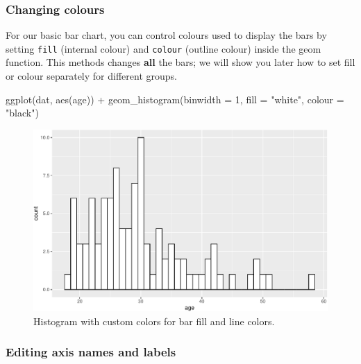 \documentclass[
  english,
  doc,floatsintext]{apa6}
\newenvironment{Shaded}{\begin{snugshade}}{\end{snugshade}}
\newcommand{\AttributeTok}[1]{\textcolor[rgb]{0.77,0.63,0.00}{#1}}
\newcommand{\DecValTok}[1]{\textcolor[rgb]{0.00,0.00,0.81}{#1}}
\newcommand{\FunctionTok}[1]{\textcolor[rgb]{0.00,0.00,0.00}{#1}}
\newcommand{\NormalTok}[1]{#1}
\newcommand{\SpecialCharTok}[1]{\textcolor[rgb]{0.00,0.00,0.00}{#1}}
\newcommand{\StringTok}[1]{\textcolor[rgb]{0.31,0.60,0.02}{#1}}
\begin{document}
\hypertarget{changing-colours}{%
\subsubsection{Changing colours}\label{changing-colours}}

For our basic bar chart, you can control colours used to display the bars by setting \texttt{fill} (internal colour) and \texttt{colour} (outline colour) inside the geom function. This methods changes \textbf{all} the bars; we will show you later how to set fill or colour separately for different groups.

\begin{Shaded}
\begin{Highlighting}[]
\FunctionTok{ggplot}\NormalTok{(dat, }\FunctionTok{aes}\NormalTok{(age)) }\SpecialCharTok{+}
  \FunctionTok{geom\_histogram}\NormalTok{(}\AttributeTok{binwidth =} \DecValTok{1}\NormalTok{, }
                 \AttributeTok{fill =} \StringTok{"white"}\NormalTok{, }
                 \AttributeTok{colour =} \StringTok{"black"}\NormalTok{)}
\end{Highlighting}
\end{Shaded}

\begin{figure}

{\centering \includegraphics[width=1\linewidth]{images/histogram-fill-color-1} 

}

\caption{Histogram with custom colors for bar fill and line colors.}\label{fig:histogram-fill-color}
\end{figure}

\hypertarget{editing-axis-names-and-labels}{%
\subsubsection{Editing axis names and labels}\label{editing-axis-names-and-labels}}
\end{document}
